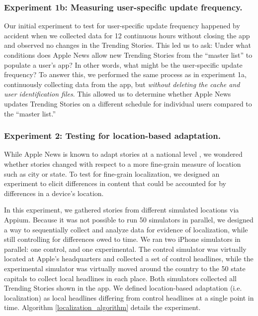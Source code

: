 \subsubsection{Experiment 1b: Measuring user-specific update frequency.}\label{user-specific}
Our initial experiment to test for user-specific update frequency happened by accident when we collected data for 12 continuous hours without closing the app and observed no changes in the Trending Stories. This led us to ask: Under what conditions does Apple News allow new Trending Stories from the ``master list'' to populate a user's app? In other words, what might be the user-specific update frequency? To answer this, we performed the same process as in experiment 1a, continuously collecting data from the app, but \textit{without deleting the cache and user identification files}. This allowed us to determine whether Apple News updates Trending Stories on a different schedule for individual users compared to the ``master list.''


\subsubsection{Experiment 2: Testing for location-based adaptation.}
While Apple News is known to adapt stories at a national level \citep{Brown2018}, we wondered whether stories changed with respect to a more fine-grain measure of location such as city or state. To test for fine-grain localization, we designed an experiment to elicit differences in content that could be accounted for by differences in a device's location.

In this experiment, we gathered stories from different simulated locations via Appium. Because it was not possible to run 50 simulators in parallel, we designed a way to sequentially collect and analyze data for evidence of localization, while still controlling for differences owed to time. We ran two iPhone simulators in parallel: one control, and one experimental. The control simulator was virtually located at Apple's headquarters and collected a set of control headlines, while the experimental simulator was virtually moved around the country to the 50 state capitals to collect local headlines in each place. Both simulators collected all Trending Stories shown in the app. We defined location-based adaptation (i.e. localization) as local headlines differing from  control headlines at a single point in time. Algorithm \ref{localization_algorithm} details the experiment.

